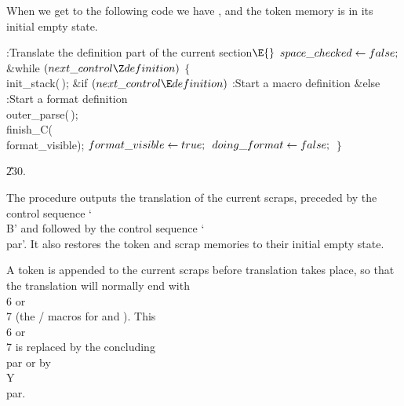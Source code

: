 When we get to the following code we have , and
the token memory is in its initial empty state.

\Y\B\4:Translate the definition part of the current section\X${}\E{}$%
\6
$\\{space\_checked}\leftarrow\\{false};{}$\6
\&{while} ${}(\\{next\_control}\Z\\{definition}){}$\5
${}\{{}$\1\6
\\{init\_stack}(\,);\6
\&{if} ${}(\\{next\_control}\E\\{definition}){}$\1\5
:Start a macro definition\X\2\6
\&{else}\1\5
:Start a format definition\X\2\6
\\{outer\_parse}(\,);\6
\\{finish\_C}(\\{format\_visible});\6
${}\\{format\_visible}\leftarrow\\{true};{}$\6
${}\\{doing\_format}\leftarrow\\{false};{}$\6
\4${}\}{}$\2\par
\U230.\fi

The  procedure outputs the translation of the current
scraps, preceded by the control sequence `\.{\\B}' and followed by the
control sequence `\.{\\par}'. It also restores the token and scrap
memories to their initial empty state.

A  token is appended to the current scraps before translation
takes place, so that the translation will normally end with \.{\\6} or
\.{\\7} (the \TEX/ macros for  and ). This \.{%
\\6} or
\.{\\7} is replaced by the concluding \.{\\par} or by \.{\\Y\\par}.

